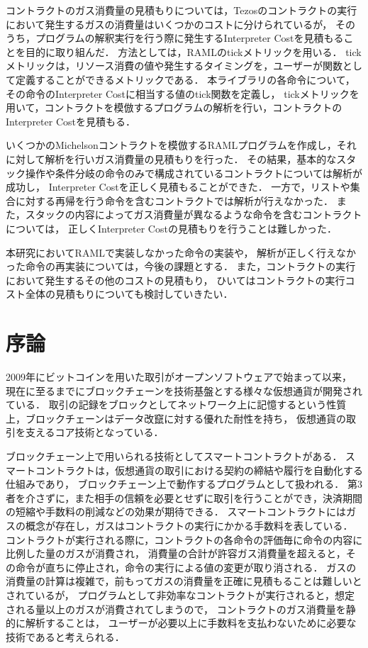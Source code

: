 \documentclass{kuisthesis}
\begin{document}
\begin{jabstract}
コントラクトのガス消費量の見積もりについては，Tezosのコントラクトの実行において発生するガスの消費量はいくつかのコストに分けられているが，
そのうち，プログラムの解釈実行を行う際に発生するInterpreter Costを見積もることを目的に取り組んだ．
方法としては，RAMLのtickメトリックを用いる．
tickメトリックは，リソース消費の値や発生するタイミングを，ユーザーが関数として定義することができるメトリックである．
本ライブラリの各命令について，その命令のInterpreter Costに相当する値のtick関数を定義し，
tickメトリックを用いて，コントラクトを模倣するプログラムの解析を行い，コントラクトのInterpreter Costを見積もる．

いくつかのMichelsonコントラクトを模倣するRAMLプログラムを作成し，それに対して解析を行いガス消費量の見積もりを行った．
その結果，基本的なスタック操作や条件分岐の命令のみで構成されているコントラクトについては解析が成功し，
Interpreter Costを正しく見積もることができた．
一方で，リストや集合に対する再帰を行う命令を含むコントラクトでは解析が行えなかった．
また，スタックの内容によってガス消費量が異なるような命令を含むコントラクトについては，
正しくInterpreter Costの見積もりを行うことは難しかった．

本研究においてRAMLで実装しなかった命令の実装や，
解析が正しく行えなかった命令の再実装については，今後の課題とする．
また，コントラクトの実行において発生するその他のコストの見積もり，
ひいてはコントラクトの実行コスト全体の見積もりについても検討していきたい．


\end{jabstract}

\begin{eabstract}

\end{eabstract}

\tableofcontents

\section{序論}\label{sec-intro}
2009年にビットコインを用いた取引がオープンソフトウェアで始まって以来，
現在に至るまでにブロックチェーンを技術基盤とする様々な仮想通貨が開発されている．
取引の記録をブロックとしてネットワーク上に記憶するという性質上，ブロックチェーンはデータ改竄に対する優れた耐性を持ち，
仮想通貨の取引を支えるコア技術となっている．

ブロックチェーン上で用いられる技術としてスマートコントラクトがある．
スマートコントラクトは，仮想通貨の取引における契約の締結や履行を自動化する仕組みであり，
ブロックチェーン上で動作するプログラムとして扱われる．
第3者を介さずに，また相手の信頼を必要とせずに取引を行うことができ，決済期間の短縮や手数料の削減などの効果が期待できる．
スマートコントラクトにはガスの概念が存在し，ガスはコントラクトの実行にかかる手数料を表している．
コントラクトが実行される際に，コントラクトの各命令の評価毎に命令の内容に比例した量のガスが消費され，
消費量の合計が許容ガス消費量を超えると，その命令が直ちに停止され，命令の実行による値の変更が取り消される．
ガスの消費量の計算は複雑で，前もってガスの消費量を正確に見積もることは難しいとされているが，
プログラムとして非効率なコントラクトが実行されると，想定される量以上のガスが消費されてしまうので，
コントラクトのガス消費量を静的に解析することは，
ユーザーが必要以上に手数料を支払わないために必要な技術であると考えられる．
\end{document}
